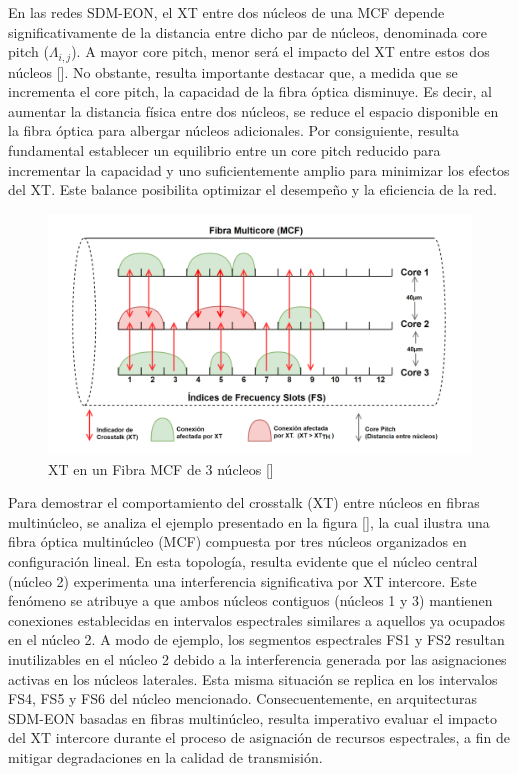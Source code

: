  En las redes SDM-EON, el XT entre dos núcleos de una MCF depende significativamente de la distancia entre dicho par de núcleos, denominada core pitch ($\Lambda_{i,j}$). A mayor core pitch, menor será el impacto del XT entre estos dos núcleos [].
 No obstante, resulta importante destacar que, a medida que se incrementa el core pitch, la capacidad de la fibra óptica disminuye. Es decir, al aumentar la distancia física entre dos núcleos, se reduce el espacio disponible en la fibra óptica para albergar núcleos adicionales.
 Por consiguiente, resulta fundamental establecer un equilibrio entre un core pitch reducido para incrementar la capacidad y uno suficientemente amplio para minimizar los efectos del XT. Este balance posibilita optimizar el desempeño y la eficiencia de la red.

\begin{figure}[H]
    \centering
    \includegraphics[width=1\textwidth]{capitulos/img/XT_MCF.png}
    \caption{XT en un Fibra MCF de 3 núcleos []}
    \label{fig:XT_MCF}
\end{figure}
%

Para demostrar el comportamiento del crosstalk (XT) entre núcleos en fibras multinúcleo, se analiza el ejemplo presentado en la figura [], la cual ilustra una fibra óptica multinúcleo (MCF) compuesta por tres núcleos organizados en configuración lineal.
En esta topología, resulta evidente que el núcleo central (núcleo 2) experimenta una interferencia significativa por XT intercore. Este fenómeno se atribuye a que ambos núcleos contiguos (núcleos 1 y 3) mantienen conexiones establecidas en intervalos espectrales similares a aquellos ya ocupados en el núcleo 2.
A modo de ejemplo, los segmentos espectrales FS1 y FS2 resultan inutilizables en el núcleo 2 debido a la interferencia generada por las asignaciones activas en los núcleos laterales.
Esta misma situación se replica en los intervalos FS4, FS5 y FS6 del núcleo mencionado. Consecuentemente, en arquitecturas SDM-EON basadas en fibras multinúcleo, resulta imperativo evaluar el impacto del XT intercore durante el proceso de asignación de recursos espectrales, a fin de mitigar degradaciones en la calidad de transmisión.

